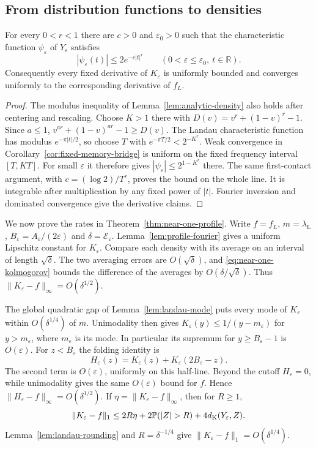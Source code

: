 \subsection{From distribution functions to densities}
\label{app:profile-rates}

\begin{lemma}\label{lem:profile-fourier}
For every $0<r<1$ there are $c>0$ and $\varepsilon_0>0$ such that
the characteristic function $\psi_\varepsilon$ of $Y_\varepsilon$ satisfies
\[
 |\psi_\varepsilon(t)|\le2e^{-c|t|^r}
 \qquad(0<\varepsilon\le\varepsilon_0,\ t\in\mathbb R).
\]
Consequently every fixed derivative of $K_\varepsilon$ is uniformly
bounded and converges uniformly to the corresponding derivative of $f_L$.
\end{lemma}

\begin{proof}
The modulus inequality of Lemma~\ref{lem:analytic-density} also holds
after centering and rescaling. Choose $K>1$ there with
$D(v)=v^r+(1-v)^r-1$. Since $a\le1$,
$v^{ar}+(1-v)^{ar}-1\ge D(v)$. The Landau characteristic function
has modulus $e^{-\pi|t|/2}$, so choose $T$ with
$e^{-\pi T/2}<2^{-K^r}$. Weak convergence in
Corollary~\ref{cor:fixed-memory-bridge} is uniform on the fixed
frequency interval $[T,KT]$. For small $\varepsilon$ it therefore gives
$|\psi_\varepsilon|\le2^{1-K^r}$ there.
The same first-contact argument, with
$c=(\log2)/T^r$, proves the bound on the whole line.
It is integrable after multiplication by any fixed power of $|t|$.
Fourier inversion and dominated convergence give the derivative claims.
\end{proof}

We now prove the rates in Theorem~\ref{thm:near-one-profile}.
Write $f=f_L$, $m=\lambda_{\mathrm L}$,
$B_\varepsilon=A_\varepsilon/(2\varepsilon)$ and
$\delta=\mathcal E_\varepsilon$.
Lemma~\ref{lem:profile-fourier} gives a uniform Lipschitz constant for
$K_\varepsilon$. Compare each density with its average on an interval
of length $\sqrt\delta$. The two averaging errors are $O(\sqrt\delta)$,
and \eqref{eq:near-one-kolmogorov} bounds the difference of the averages
by $O(\delta/\sqrt\delta)$. Thus
$\|K_\varepsilon-f\|_\infty=O(\delta^{1/2})$.

The global quadratic gap of Lemma~\ref{lem:landau-mode} puts every
mode of $K_\varepsilon$ within $O(\delta^{1/4})$ of $m$.
Unimodality then gives
$K_\varepsilon(y)\le1/(y-m_\varepsilon)$ for $y>m_\varepsilon$,
where $m_\varepsilon$ is its mode. In particular its supremum for
$y\ge B_\varepsilon-1$ is $O(\varepsilon)$.
For $z<B_\varepsilon$ the folding identity is
\[
 H_\varepsilon(z)=K_\varepsilon(z)+K_\varepsilon(2B_\varepsilon-z).
\]
The second term is $O(\varepsilon)$, uniformly on this half-line.
Beyond the cutoff $H_\varepsilon=0$, while unimodality gives the same
$O(\varepsilon)$ bound for $f$. Hence
$\|H_\varepsilon-f\|_\infty=O(\delta^{1/2})$.
If $\eta=\|K_\varepsilon-f\|_\infty$, then for $R\ge1$,
\[
 \|K_\varepsilon-f\|_1
 \le2R\eta+2\Prob(|Z|>R)+4d_{\rm K}(Y_\varepsilon,Z).
\]
Lemma~\ref{lem:landau-rounding} and $R=\delta^{-1/4}$ give
$\|K_\varepsilon-f\|_1=O(\delta^{1/4})$.


